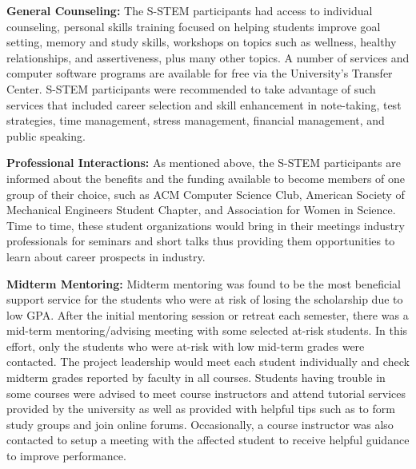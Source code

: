\documentclass{article}
\begin{document}
\textbf{General Counseling:} The S-STEM participants had access to individual counseling, personal skills training focused on helping students improve goal setting, memory and study skills, workshops on topics such as wellness, healthy relationships, and assertiveness, plus many other topics. A number of services and computer software programs are available for free via the University’s Transfer Center.  S-STEM participants were recommended to take advantage of such services that included career selection and skill enhancement in note-taking, test strategies, time management, stress management, financial management, and public speaking. 

\textbf{Professional Interactions:} As mentioned above, the S-STEM participants are informed about the benefits and the funding available to become members of one group of their choice, such as ACM Computer Science Club, American Society of Mechanical Engineers Student Chapter, and Association for Women in Science. Time to time, these student organizations would bring in their meetings industry professionals for seminars and short talks thus providing them opportunities to learn about career prospects in industry.

\textbf{Midterm Mentoring:} Midterm mentoring was found to be the most beneficial support service for the students who were at risk of losing the scholarship due to low GPA. After the initial mentoring session or retreat each semester, there was a mid-term mentoring/advising meeting with some selected at-risk students. In this effort, only the students who were at-risk with low mid-term grades were contacted. The project leadership would meet each student individually and check midterm grades reported by faculty in all courses. Students having trouble in some courses were advised to meet course instructors and attend tutorial services provided by the university as well as provided with helpful tips such as to form study groups and join online forums.  Occasionally, a course instructor was also contacted to setup a meeting with the affected student to receive helpful guidance to improve performance. 
\end{document}
